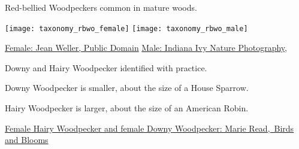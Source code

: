\documentclass[t]{beamer}
\begin{document}
\begin{frame}{Red-bellied Woodpeckers common in mature woods.}

\texttt{[image: taxonomy\_rbwo\_female]}\hfill
\texttt{[image: taxonomy\_rbwo\_male]}


\vfilll

\tiny \href{https://flickr.com/photos/188361162@N03/49879499767}{Female: Jean Weller, Public Domain} \hfill \href{https://flickr.com/photos/indianaivy/6957915661}{Male: Indiana Ivy Nature Photography, }
\end{frame}



\begin{frame}{Downy and Hairy Woodpecker identified with practice.}

\vspace{-\baselineskip}

\begin{multicols}{2}

\columnbreak

Downy Woodpecker is smaller, about the size of a House Sparrow.

\bigskip

Hairy Woodpecker is larger, about the size of an American Robin.

\end{multicols}



\tinyfill

\href{https://www.birdsandblooms.com/birding/bird-species/tell-difference-downy-hairy-woodpeckers/}{Female Hairy Woodpecker and female Downy Woodpecker: Marie Read, \textcopyright\,Birds and Blooms} 
\end{frame}
\end{document}
